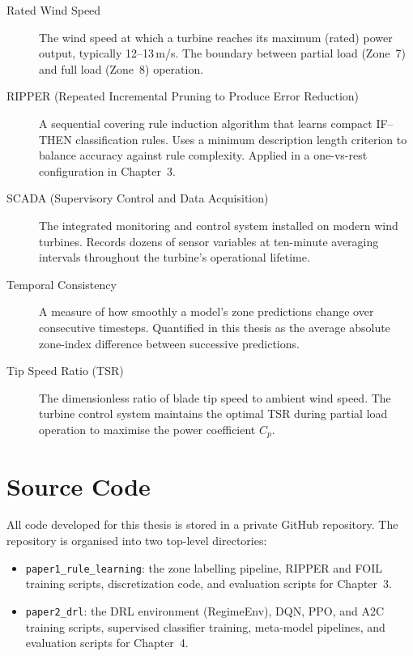 \begin{description}
  \item[Rated Wind Speed] The wind speed at which a turbine reaches its maximum (rated)
    power output, typically 12--13\,m/s. The boundary between partial load (Zone~7) and
    full load (Zone~8) operation.

  \item[RIPPER (Repeated Incremental Pruning to Produce Error Reduction)] A sequential
    covering rule induction algorithm that learns compact IF--THEN classification rules.
    Uses a minimum description length criterion to balance accuracy against rule
    complexity. Applied in a one-vs-rest configuration in Chapter~3.

  \item[SCADA (Supervisory Control and Data Acquisition)] The integrated monitoring and
    control system installed on modern wind turbines. Records dozens of sensor variables
    at ten-minute averaging intervals throughout the turbine's operational lifetime.

  \item[Temporal Consistency] A measure of how smoothly a model's zone predictions change
    over consecutive timesteps. Quantified in this thesis as the average absolute
    zone-index difference between successive predictions.

  \item[Tip Speed Ratio (TSR)] The dimensionless ratio of blade tip speed to ambient
    wind speed. The turbine control system maintains the optimal TSR during partial load
    operation to maximise the power coefficient $C_p$.
\end{description}

\chapter{Source Code}
\label{app:code}

All code developed for this thesis is stored in a private GitHub repository. The
repository is organised into two top-level directories:

\begin{itemize}
  \item \texttt{paper1\_rule\_learning}: the zone labelling pipeline, RIPPER and FOIL
    training scripts, discretization code, and evaluation scripts for Chapter~3.
  \item \texttt{paper2\_drl}: the DRL environment (RegimeEnv), DQN, PPO, and A2C
    training scripts, supervised classifier training, meta-model pipelines, and
    evaluation scripts for Chapter~4.
\end{itemize}


